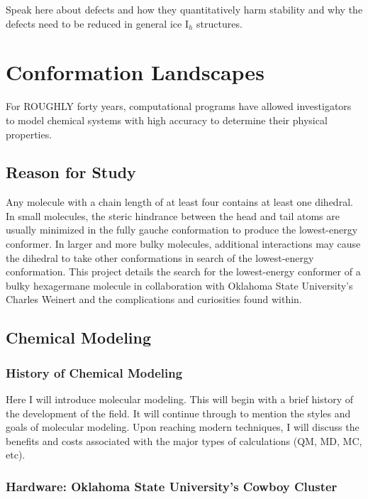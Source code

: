 Speak here about defects and how they quantitatively harm stability and why the defects need to be reduced in general ice I$_{h}$ structures.

\section{Conformation Landscapes}

For ROUGHLY forty years, computational programs have allowed investigators to model chemical systems with high accuracy to determine their physical properties.

\subsection{Reason for Study}

Any molecule with a chain length of at least four contains at least one dihedral. 
In small molecules, the steric hindrance between the head and tail atoms are usually minimized in the fully gauche conformation to produce the lowest-energy conformer. 
In larger and more bulky molecules, additional interactions may cause the dihedral to take other conformations in search of the lowest-energy conformation. 
This project details the search for the lowest-energy conformer of a bulky hexagermane molecule in collaboration with Oklahoma State University's Charles Weinert and the complications and curiosities found within.

\subsection{Chemical Modeling}

\subsubsection{History of Chemical Modeling}

Here I will introduce molecular modeling. This will begin with a brief history of the development of the field. It will continue through to mention the styles and goals of molecular modeling. Upon reaching modern techniques, I will discuss the benefits and costs associated with the major types of calculations (QM, MD, MC, etc). 

\subsubsection{Hardware: Oklahoma State University's Cowboy Cluster}

